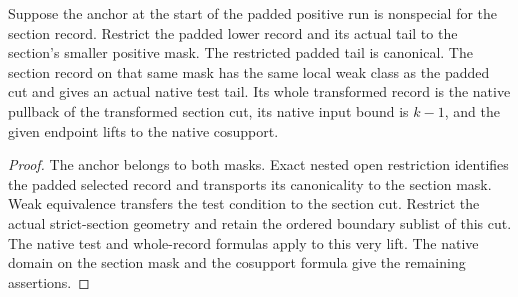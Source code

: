 \begin{theorem}
\label{hir:g1-positive-normal-shared-tail}
\leanok
Suppose the anchor at the start of the padded positive run is
nonspecial for the section record. Restrict the padded lower record
and its actual tail to the section's smaller positive mask. The
restricted padded tail is canonical. The section record on that same
mask has the same local weak class as the padded cut and gives an
actual native test tail. Its whole transformed record is the native
pullback of the transformed section cut, its native input bound is
$k-1$, and the given endpoint lifts to the native cosupport.
\end{theorem}
\begin{proof}
The anchor belongs to both masks. Exact nested open restriction
identifies the padded selected record and transports its canonicality
to the section mask. Weak equivalence transfers the test condition
to the section cut. Restrict the actual strict-section geometry
and retain the ordered boundary sublist of this cut. The native
test and whole-record formulas apply to this very lift. The
native domain on the section mask and the cosupport formula give
the remaining assertions.
\end{proof}

